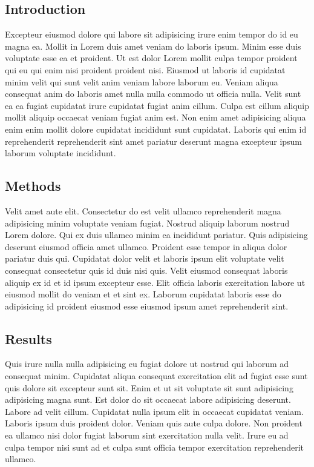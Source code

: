 \documentclass[
  super,
  preprint,
  3p]{elsarticle}
\begin{document}
\newpage{}

\hypertarget{introduction}{%
\subsection{Introduction}\label{introduction}}

Excepteur eiusmod dolore qui labore sit adipisicing irure enim tempor do
id eu magna ea. Mollit in Lorem duis amet veniam do laboris ipsum. Minim
esse duis voluptate esse ea et proident. Ut est dolor Lorem mollit culpa
tempor proident qui eu qui enim nisi proident proident nisi. Eiusmod ut
laboris id cupidatat minim velit qui sunt velit anim veniam labore
laborum eu. Veniam aliqua consequat anim do laboris amet nulla nulla
commodo ut officia nulla. Velit sunt ea ea fugiat cupidatat irure
cupidatat fugiat anim cillum. Culpa est cillum aliquip mollit aliquip
occaecat veniam fugiat anim est. Non enim amet adipisicing aliqua enim
enim mollit dolore cupidatat incididunt sunt cupidatat. Laboris qui enim
id reprehenderit reprehenderit sint amet pariatur deserunt magna
excepteur ipsum laborum voluptate incididunt.

\newpage{}

\hypertarget{methods}{%
\subsection{Methods}\label{methods}}

Velit amet aute elit. Consectetur do est velit ullamco reprehenderit
magna adipisicing minim voluptate veniam fugiat. Nostrud aliquip laborum
nostrud Lorem dolore. Qui ex duis ullamco minim ea incididunt pariatur.
Quis adipisicing deserunt eiusmod officia amet ullamco. Proident esse
tempor in aliqua dolor pariatur duis qui. Cupidatat dolor velit et
laboris ipsum elit voluptate velit consequat consectetur quis id duis
nisi quis. Velit eiusmod consequat laboris aliquip ex id et id ipsum
excepteur esse. Elit officia laboris exercitation labore ut eiusmod
mollit do veniam et et sint ex. Laborum cupidatat laboris esse do
adipisicing id proident eiusmod esse eiusmod ipsum amet reprehenderit
sint.

\newpage{}

\hypertarget{results}{%
\subsection{Results}\label{results}}

Quis irure nulla nulla adipisicing eu fugiat dolore ut nostrud qui
laborum ad consequat minim. Cupidatat aliqua consequat exercitation elit
ad fugiat esse sunt quis dolore sit excepteur sunt sit. Enim et ut sit
voluptate sit sunt adipisicing adipisicing magna sunt. Est dolor do sit
occaecat labore adipisicing deserunt. Labore ad velit cillum. Cupidatat
nulla ipsum elit in occaecat cupidatat veniam. Laboris ipsum duis
proident dolor. Veniam quis aute culpa dolore. Non proident ea ullamco
nisi dolor fugiat laborum sint exercitation nulla velit. Irure eu ad
culpa tempor nisi sunt ad et culpa sunt officia tempor exercitation
reprehenderit ullamco.
\end{document}
